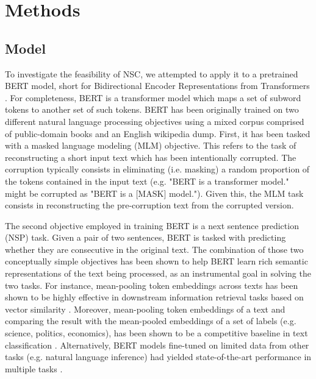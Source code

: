\section{Methods}\label{sec:methods}

\subsection{Model}

To investigate the feasibility of NSC, we attempted to apply it to a pretrained BERT model, short for Bidirectional Encoder Representations from Transformers \citep{devlin_bert_nodate}. For completeness, BERT is a transformer model which maps a set of subword tokens to another set of such tokens. BERT has been originally trained on two different natural language processing objectives using a mixed corpus comprised of public-domain books and an English wikipedia dump. First, it has been tasked with a masked language modeling (MLM) objective. This refers to the task of reconstructing a short input text which has been intentionally corrupted. The corruption typically consists in eliminating (i.e. masking) a random proportion of the tokens contained in the input text (e.g. "BERT is a transformer model." might be corrupted as "BERT is a [MASK] model."). Given this, the MLM task consists in reconstructing the pre-corruption text from the corrupted version.

The second objective employed in training BERT is a next sentence prediction (NSP) task. Given a pair of two sentences, BERT is tasked with predicting whether they are consecutive in the original text. The combination of those two conceptually simple objectives has been shown to help BERT learn rich semantic representations of the text being processed, as an instrumental goal in solving the two tasks. For instance, mean-pooling token embeddings across texts has been shown to be highly effective in downstream information retrieval tasks based on vector similarity \citep{reimers_sentence-bert_2019}. Moreover, mean-pooling token embeddings of a text and comparing the result with the mean-pooled embeddings of a set of labels (e.g. science, politics, economics), has been shown to be a competitive baseline in text classification \citep{yin_benchmarking_2019}. Alternatively, BERT models fine-tuned on limited data from other tasks (e.g. natural language inference) had yielded state-of-the-art performance in multiple tasks \citep{jiang_evaluating_2019}.

